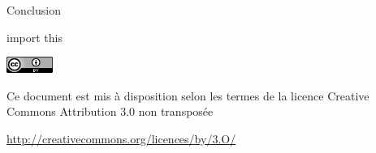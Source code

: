 \documentclass[xcolor=pdftex,dvipsnames,table,handout]{beamer}
\begin{document}
\begin{frame}{Conclusion}
\begin{center}
    \Huge{import this}
\end{center}
\end{frame}

\begin{frame}[plain]
\vfill
\vfill
\vfill
\begin{center}
{\footnotesize%
\includegraphics[width=1.5cm]{img/logo/cc_by}

Ce document est mis à disposition selon les termes de la licence Creative Commons Attribution 3.0 non transposée

\url{http://creativecommons.org/licences/by/3.O/}
}
\end{center}
\end{frame}
\end{document}
